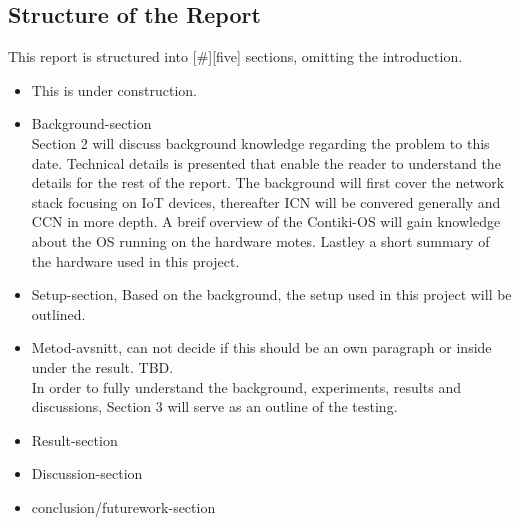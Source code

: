 \subsection{Structure of the Report}
	This report is structured into [$\#$][five] sections, omitting the introduction.
\begin{itemize}
	\item This is under construction.
	\item Background-section
	\\Section 2 will discuss background knowledge regarding the problem to this date. Technical details is presented that enable the reader to understand the details for the rest of the report. The background will first cover the network stack focusing on IoT devices, thereafter ICN will be convered generally and CCN in more depth. A breif overview of the Contiki-OS will gain knowledge about the OS running on the hardware motes. Lastley a short summary of the hardware used in this project.
	\item Setup-section, Based on the background, the setup used in this project will be outlined.
	\item Metod-avsnitt, can not decide if this should be an own paragraph or inside under the result. TBD.
	\\In order to fully understand the background, experiments, results and discussions, Section 3 will serve as an outline of the testing. 
	\item Result-section
	\item Discussion-section
	\item conclusion/futurework-section

\end{itemize}